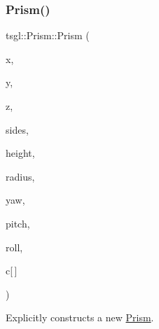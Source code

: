\subsubsection{\texorpdfstring{Prism()}{Prism()}\hspace{0.1cm}{\footnotesize\ttfamily [2/2]}}
{\footnotesize\ttfamily tsgl\+::\+Prism\+::\+Prism (\begin{DoxyParamCaption}\item[{float}]{x,  }\item[{float}]{y,  }\item[{float}]{z,  }\item[{int}]{sides,  }\item[{G\+Lfloat}]{height,  }\item[{G\+Lfloat}]{radius,  }\item[{float}]{yaw,  }\item[{float}]{pitch,  }\item[{float}]{roll,  }\item[{\hyperlink{structtsgl_1_1_color_float}{Color\+Float}}]{c\mbox{[}$\,$\mbox{]} }\end{DoxyParamCaption})}



Explicitly constructs a new \hyperlink{classtsgl_1_1_prism}{Prism}. 

